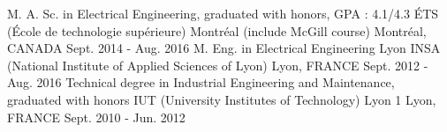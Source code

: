 

\begin{cventries}


\cventry
{M. A. Sc. in Electrical Engineering, graduated with honors, GPA : 4.1/4.3} %
{ÉTS (École de technologie supérieure) Montréal (include McGill course)} %
{Montréal, CANADA} %
{Sept. 2014 - Aug. 2016} %
{ %
}
\cventry
{M. Eng. in Electrical Engineering} %
{Lyon INSA (National Institute of Applied Sciences of Lyon)} %
{Lyon, FRANCE} %
{Sept. 2012 - Aug. 2016} %
{ %
}
\cventry
{Technical degree in Industrial Engineering and Maintenance, graduated with honors} %
{IUT (University Institutes of Technology) Lyon 1} %
{Lyon, FRANCE} %
{Sept. 2010 - Jun. 2012} %
{ %
}
\vspace{-5mm}
\end{cventries}